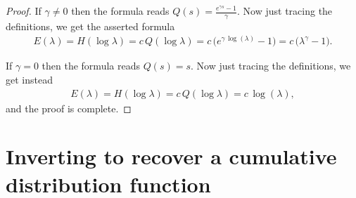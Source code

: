 \begin{proof}
  If $\gamma \ne 0$ then the formula reads
  $Q(s) = \frac{e^{\gamma s} - 1}{\gamma}$.
  Now just tracing the definitions, we get the asserted formula
  \begin{align*}
  E(\lambda) = H(\log \lambda)
    = c \, Q(\log \lambda) = c \, \big( e^{\gamma \, \log(\lambda)} - 1 \big)
    = c \, \big( \lambda^{\gamma} - 1 \big) .
  \end{align*}

  If $\gamma = 0$ then the formula reads $Q(s) = s$.
  Now just tracing the definitions, we get instead
  \begin{align*}
  E(\lambda) = H(\log \lambda)
    = c \, Q(\log \lambda) = c \, \log(\lambda) ,
  \end{align*}
  and the proof is complete.
\end{proof}


\section{Inverting to recover a cumulative distribution function}

